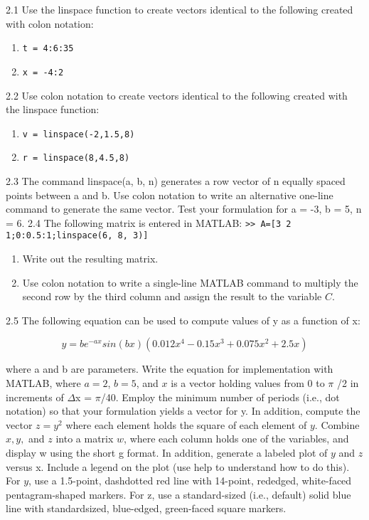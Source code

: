 \documentclass[../main.tex]{subfiles}
\begin{document}
\begin{multicols}{2}

	2.1 Use the linspace function to create vectors identical to
	the following created with colon notation:
	\begin{enumerate}[label=(\alph*)]
		\item \texttt{t = 4:6:35}
		\item \texttt{x = -4:2}
	\end{enumerate}
	
	2.2 Use colon notation to create vectors identical to the
	following created with the linspace function:
	\begin{enumerate}[label=(\alph*)]
		\item \texttt{v = linspace(-2,1.5,8)}
		\item \texttt{r = linspace(8,4.5,8)}
	\end{enumerate}
	

	2.3 The command linspace(a, b, n) generates a row
	vector of n equally spaced points between a and b. Use
	colon notation to write an alternative one-line command to
	generate the same vector. Test your formulation for a = -3,
	b = 5, n = 6.
	2.4 The following matrix is entered in MATLAB:
	\texttt{>> A=[3 2 1;0:0.5:1;linspace(6, 8, 3)]}
	\begin{enumerate}[label=(\alph*)]
		\item Write out the resulting matrix.
		\item Use colon notation to write a single-line MATLAB command to multiply the second row by the third column
		and assign the result to the variable $C$.
	\end{enumerate}
	

	2.5 The following equation can be used to compute values
	of y as a function of x:

	$$y=be^{-ax}sin(bx)(0.012x^4-0.15x^3+0.075x^2+2.5x) $$

	where a and b are parameters. Write the equation for implementation with MATLAB, 
	where $a = 2$, $b = 5$, and $x$ is a
vector holding values from 0 to $ \pi $ /2 in increments of
$ \Delta $x = $ \pi $/40. Employ the minimum number of periods (i.e.,
dot notation) so that your formulation yields a vector for y.
In addition, compute the vector $z = y^2$ where each element
holds the square of each element of $y$. Combine $x, y,$ and $z$
into a matrix $w$, where each column holds one of the variables, and display w using the short g format. In addition,
generate a labeled plot of $y$ and $z$ versus x. Include a legend
on the plot (use help to understand how to do this). For $y$,
use a 1.5-point, dashdotted red line with 14-point, rededged, white-faced pentagram-shaped markers. For z, use a
standard-sized (i.e., default) solid blue line with standardsized, blue-edged, green-faced square markers.



\end{multicols}
\end{document}
